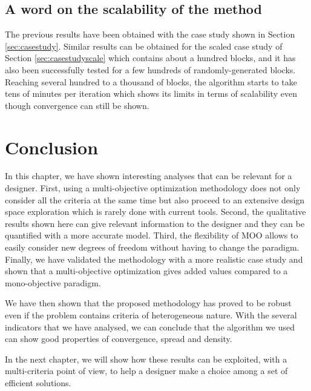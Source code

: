 \subsection{A word on the scalability of the method}
The previous results have been obtained with the case study shown in Section \ref{sec:casestudy}. Similar results can be obtained for the scaled case study of Section \ref{sec:casestudyscale} which contains about a hundred blocks, and it has also been successfully tested for a few hundreds of randomly-generated blocks. Reaching several hundred to a thousand of blocks, the algorithm starts to take tens of minutes per iteration which shows its limits in terms of scalability even though convergence can still be shown.

\section{Conclusion}

In this chapter, we have shown interesting analyses that can be relevant for a designer. First, using a multi-objective optimization methodology does not only consider all the criteria at the same time but also proceed to an extensive design space exploration which is rarely done with current tools. Second, the qualitative results shown here can give relevant information to the designer and they can be quantified with a more accurate model. Third, the flexibility of MOO allows to easily consider new degrees of freedom without having to change the paradigm. Finally, we have validated the methodology with a more realistic case study and shown that a multi-objective optimization gives added values compared to a mono-objective paradigm.

We have then shown that the proposed methodology has proved to be robust even if the problem contains criteria of heterogeneous nature. With the several indicators that we have analysed, we can conclude that the algorithm we used can show good properties of convergence, spread and density.

In the next chapter, we will show how these results can be exploited, with a multi-criteria point of view, to help a designer make a choice among a set of efficient solutions.

